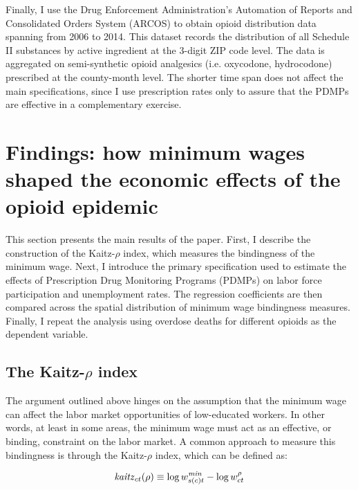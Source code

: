 \documentclass[12pt,a4paper]{article}
\begin{document}
Finally, I use the Drug Enforcement Administration's Automation of Reports and Consolidated Orders System (ARCOS) to obtain opioid distribution data spanning from 2006 to 2014.
This dataset records the distribution of all Schedule II substances by active ingredient at the 3-digit ZIP code level.
The data is aggregated on semi-synthetic opioid analgesics (i.e. oxycodone, hydrocodone) prescribed at the county-month level.
The shorter time span does not affect the main specifications, since I use prescription rates only to assure that the PDMPs are effective in a complementary exercise.

\section*{Findings: how minimum wages shaped the economic effects of the opioid epidemic}

This section presents the main results of the paper. 
First, I describe the construction of the Kaitz-\(\rho\) index, which measures the bindingness of the minimum wage.
Next, I introduce the primary specification used to estimate the effects of Prescription Drug Monitoring Programs (PDMPs) on labor force participation and unemployment rates. 
The regression coefficients are then compared across the spatial distribution of minimum wage bindingness measures.
Finally, I repeat the analysis using overdose deaths for different opioids as the dependent variable.

\subsection*{The Kaitz-\(\rho\) index}

The argument outlined above hinges on the assumption that the minimum wage can affect the labor market opportunities of low-educated workers.
In other words, at least in some areas, the minimum wage must act as an effective, or binding, constraint on the labor market.
A common approach to measure this bindingness is through the Kaitz-\(\rho\) index, which can be defined as:

\begin{equation}
    \text{\textit{kaitz}}_{ct}(\rho) \equiv \log{w^{\text{\textit{min}}}_{s(c)t}} - \log{w^{\rho}_{ct}}
\end{equation}
\end{document}
